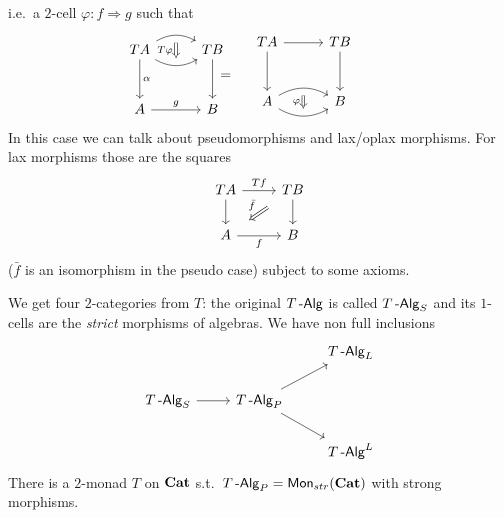 \documentclass[a4paper,11pt,oneside,openany]{scrbook}
\begin{document}
\begin{exmp}
\begin{enumerate}
\[		      \]
		      i.e.\ a $2$-cell $\varphi\colon f\Rightarrow g$ such that
		      \[
			      \begin{minipage}{0.3\linewidth}
				      \begin{tikzcd}[row sep=1cm, column sep=1cm]
					      TA\arrow[d, "\alpha"] \arrow[r, bend right, ""{name=D, anchor=center}] \arrow[r, bend left, ""{name=U, anchor=center}] & TB \arrow[d] \\
					      A\arrow[r, "g"]            &B
					      \ar[Rightarrow, shorten <= .3em, shorten >= .3em, "T\varphi"', from=U, to=D]
				      \end{tikzcd}
			      \end{minipage}
			      \hspace{-1.3cm}
			      =
			      \hspace{.4cm}
			      \begin{minipage}{0.3\linewidth}
				      \begin{tikzcd}[row sep=1cm, column sep=1cm]
					      TA\arrow[d] \arrow[r]                        &  TB\arrow[d] \\
					      A\arrow[r, bend right, ""{name=D, anchor=center}] \arrow[r, bend left, ""{name=U, anchor=center}] &      B
					      \ar[Rightarrow, shorten <= .3em, shorten >= .3em, "\varphi"', from=U, to=D]
				      \end{tikzcd}
			      \end{minipage}
		      \]
		      In this case we can talk about pseudomorphisms and lax/oplax morphisms. For lax morphisms those are the squares
		      \[
			      \begin{tikzcd}
				      TA\arrow[d]\arrow["Tf"]{r}
				      & TB\arrow[d] \arrow[dl, Rightarrow, shorten <= 1em, shorten >= 1em, "\bar{f}"']  \\
				      A\arrow["f"']{r}
				      & B
			      \end{tikzcd}
		      \]
		      ($\bar{f}$ is an isomorphism in the pseudo case) subject to some axioms.
	\end{enumerate}
\end{exmp}
We get four $2$-categories from $T$: the original $T\operatorname{-\mathsf{Alg}}$ is called $T\operatorname{-\mathsf{Alg}}_S$ and its $1$-cells are the \emph{strict} morphisms of algebras. We have non full inclusions
\[
	\begin{tikzcd}
		&& T\Alg_L\\
		T\Alg_S \arrow[r]
		& T\Alg_P \arrow[ur]    \arrow[dr] \\
		&& T\Alg^L
	\end{tikzcd}
\]
There is a $2$-monad $T$ on ${\normalfont\textbf{Cat}}$ s.t.\ $T\operatorname{-\mathsf{Alg}}_P=\operatorname{\mathsf{Mon}}_{str}({\normalfont\textbf{Cat}})$ with strong morphisms.
\end{document}
